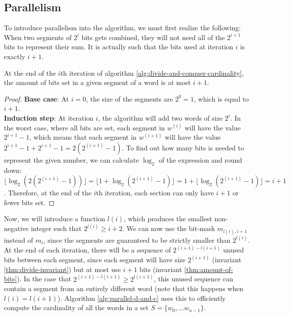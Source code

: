 \subsection{Parallelism}
To introduce parallelism into the algorithm, we must first realize the following: When two segments of $2^i$ bits gets combined, they will not need all of the $2^{i+1}$ bits to represent their sum. It is actually such that the bits used at iteration $i$ is exactly $i+1$.
\begin{invariant}
    \label{thm:amount-of-bits}
    At the end of the $i$th iteration of algorithm \ref{alg:divide-and-conquer-cardinality}, the amount of bits set in a given segment of a word is at most $i+1$.
\end{invariant}
\begin{proof}
    \textbf{Base case}: At $i=0$, the size of the segments are $2^0 = 1$, which is equal to $i+1$.\\
    \textbf{Induction step}: At iteration $i$, the algorithm will add two words of size $2^i$. In the worst case, where all bits are set, each segment in $w^{(i)}$ will have the value $2^{i+1}-1$, which means that each segment in $w^{(i+1)}$ will have the value $2^{i+1}-1 + 2^{i+1}-1 = 2(2^{(i+1)} - 1)$. To find out how many bits is needed to represent the given number, we can calculate $\log_2$ of the expression and round down: $\lfloor \log_2{(2(2^{(i+1)} - 1))}\rfloor=\lfloor 1 + \log_2{(2^{(i+1)}-1)} \rfloor = 1+\lfloor \log_2{(2^{(i+1)}-1)}\rfloor = i + 1$. Therefore, at the end of the $i$th iteration, each section can only have $i+1$ or fewer bits set.
\end{proof}
Now, we will introduce a function $l(i)$, which produces the smallest non-negative integer such that $2^{l(i)} \geq i + 2$. We can now use the bit-mask $m_{l(i), i+1}$ instead of $m_{i}$, since the segments are guaranteed to be strictly smaller than $2^{l(i)}$. At the end of each iteration, there will be a sequence of $2^{(i+1)-l(i+1)}$ unused bits between each segment, since each segment will have size $2^{(i+1)}$ (invariant \ref{thm:divide-invariant}) but at most use $i+1$ bits (invariant \ref{thm:amount-of-bits}). In the case that $2^{(i+1) - l(i+1)} \geq 2^{l(i+1)}$, this unused sequence can contain a segment from an entirely different word (note that this happens when $l(i)=l(i+1)$). Algorithm \ref{alg:parallel-d-and-c} uses this to efficiently compute the cardinality of all the words in a set $S = \{w_0, \dots w_{n-1}\}$.
